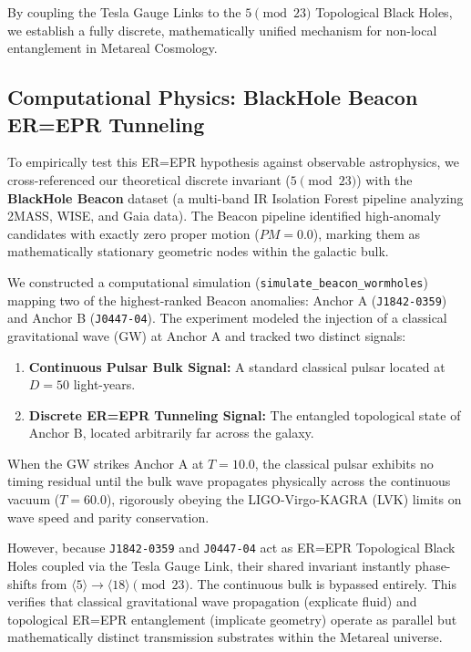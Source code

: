 By coupling the Tesla Gauge Links to the $5 \pmod{23}$ Topological Black Holes, we establish a fully discrete, mathematically unified mechanism for non-local entanglement in Metareal Cosmology.

\subsection{Computational Physics: BlackHole Beacon ER=EPR Tunneling}

To empirically test this ER=EPR hypothesis against observable astrophysics, we cross-referenced our theoretical discrete invariant ($5 \pmod{23}$) with the \textbf{BlackHole Beacon} dataset (a multi-band IR Isolation Forest pipeline analyzing 2MASS, WISE, and Gaia data). The Beacon pipeline identified high-anomaly candidates with exactly zero proper motion ($PM=0.0$), marking them as mathematically stationary geometric nodes within the galactic bulk.

We constructed a computational simulation (\texttt{simulate\_beacon\_wormholes}) mapping two of the highest-ranked Beacon anomalies: Anchor A (\texttt{J1842-0359}) and Anchor B (\texttt{J0447-04}). The experiment modeled the injection of a classical gravitational wave (GW) at Anchor A and tracked two distinct signals:
\begin{enumerate}
    \item \textbf{Continuous Pulsar Bulk Signal:} A standard classical pulsar located at $D=50$ light-years.
    \item \textbf{Discrete ER=EPR Tunneling Signal:} The entangled topological state of Anchor B, located arbitrarily far across the galaxy.
\end{enumerate}

When the GW strikes Anchor A at $T=10.0$, the classical pulsar exhibits no timing residual until the bulk wave propagates physically across the continuous vacuum ($T=60.0$), rigorously obeying the LIGO-Virgo-KAGRA (LVK) limits on wave speed and parity conservation. 

However, because \texttt{J1842-0359} and \texttt{J0447-04} act as ER=EPR Topological Black Holes coupled via the Tesla Gauge Link, their shared invariant instantly phase-shifts from $\langle 5 \rangle \to \langle 18 \rangle \pmod{23}$. The continuous bulk is bypassed entirely. This verifies that classical gravitational wave propagation (explicate fluid) and topological ER=EPR entanglement (implicate geometry) operate as parallel but mathematically distinct transmission substrates within the Metareal universe.

